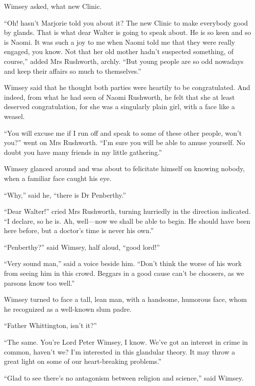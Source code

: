 Wimsey asked, what new Clinic.

\enquote{Oh! hasn't Marjorie told you about it? The new Clinic to make everybody good by glands. That is what dear Walter is going to speak about. He is so keen and so is Naomi. It was such a joy to me when Naomi told me that they were really engaged, you know. Not that her old mother hadn't suspected something, of course,} added Mrs Rushworth, archly. \enquote{But young people are so odd nowadays and keep their affairs so much to themselves.}

Wimsey said that he thought both parties were heartily to be congratulated. And indeed, from what he had seen of Naomi Rushworth, he felt that she at least deserved congratulation, for she was a singularly plain girl, with a face like a weasel.

\enquote{You will excuse me if I run off and speak to some of these other people, won't you?} went on Mrs Rushworth. \enquote{I'm sure you will be able to amuse yourself. No doubt you have many friends in my little gathering.}

Wimsey glanced around and was about to felicitate himself on knowing nobody, when a familiar face caught his eye.

\enquote{Why,} said he, \enquote{there is Dr Penberthy.}

\enquote{Dear Walter!} cried Mrs Rushworth, turning hurriedly in the direction indicated. \enquote{I declare, so he is. Ah, well\allowbreak---\allowbreak now we shall be able to begin. He should have been here before, but a doctor's time is never his own.}

\enquote{Penberthy?} said Wimsey, half aloud, \enquote{good lord!}

\enquote{Very sound man,} said a voice beside him. \enquote{Don't think the worse of his work from seeing him in this crowd. Beggars in a good cause can't be choosers, as we parsons know too well.}

Wimsey turned to face a tall, lean man, with a handsome, humorous face, whom he recognized as a well-known slum padre.

\enquote{Father Whittington, isn't it?}

\enquote{The same. You're Lord Peter Wimsey, I know. We've got an interest in crime in common, haven't we? I'm interested in this glandular theory. It may throw a great light on some of our heart-breaking problems.}

\enquote{Glad to see there's no antagonism between religion and science,} said Wimsey.

